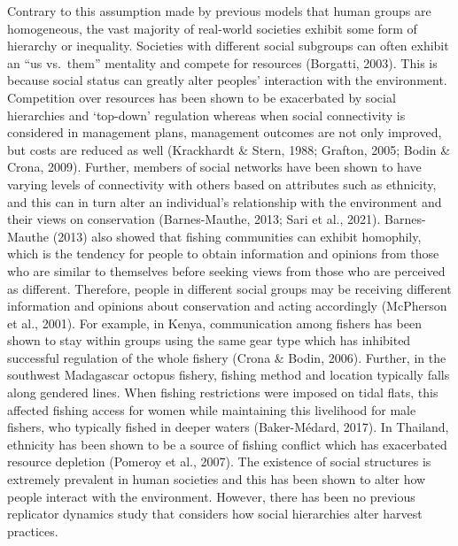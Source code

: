 \documentclass[
]{article}
\begin{document}
Contrary to this assumption made by previous models that human groups are homogeneous, the vast majority of real-world societies exhibit some form of hierarchy or inequality. Societies with different social subgroups can often exhibit an ``us vs.~them'' mentality and compete for resources (Borgatti, 2003). This is because social status can greatly alter peoples' interaction with the environment. Competition over resources has been shown to be exacerbated by social hierarchies and `top-down' regulation whereas when social connectivity is considered in management plans, management outcomes are not only improved, but costs are reduced as well (Krackhardt \& Stern, 1988; Grafton, 2005; Bodin \& Crona, 2009). Further, members of social networks have been shown to have varying levels of connectivity with others based on attributes such as ethnicity, and this can in turn alter an individual's relationship with the environment and their views on conservation (Barnes-Mauthe, 2013; Sari et al., 2021). Barnes-Mauthe (2013) also showed that fishing communities can exhibit homophily, which is the tendency for people to obtain information and opinions from those who are similar to themselves before seeking views from those who are perceived as different. Therefore, people in different social groups may be receiving different information and opinions about conservation and acting accordingly (McPherson et al., 2001). For example, in Kenya, communication among fishers has been shown to stay within groups using the same gear type which has inhibited successful regulation of the whole fishery (Crona \& Bodin, 2006). Further, in the southwest Madagascar octopus fishery, fishing method and location typically falls along gendered lines. When fishing restrictions were imposed on tidal flats, this affected fishing access for women while maintaining this livelihood for male fishers, who typically fished in deeper waters (Baker-Médard, 2017). In Thailand, ethnicity has been shown to be a source of fishing conflict which has exacerbated resource depletion (Pomeroy et al., 2007). The existence of social structures is extremely prevalent in human societies and this has been shown to alter how people interact with the environment. However, there has been no previous replicator dynamics study that considers how social hierarchies alter harvest practices.
\end{document}
